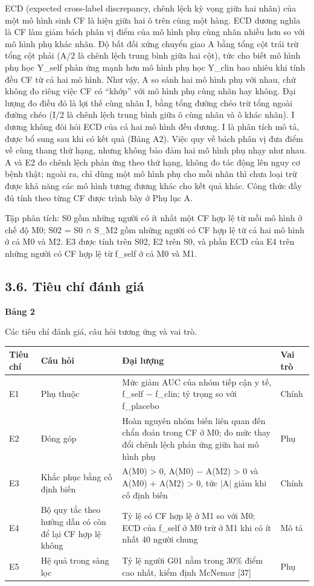 \documentclass[9pt,a4paper]{extarticle}
\newcommand{\tabcap}[2]{{\footnotesize\textbf{Bảng #1}\par\vspace{1pt}#2\par}\vspace{3pt}\scriptsize}
\begin{document}
ECD (expected cross-label discrepancy, chênh lệch kỳ vọng giữa hai nhãn)
của một mô hình sinh CF là hiệu giữa hai ô trên cùng một hàng. ECD dương
nghĩa là CF làm giảm bách phân vị điểm của mô hình phụ cùng nhãn nhiều
hơn so với mô hình phụ khác nhãn. Độ bất đối xứng chuyển giao A bằng
tổng cột trái trừ tổng cột phải (A/2 là chênh lệch trung bình giữa hai
cột), tức cho biết mô hình phụ học Y\_self phản ứng mạnh hơn mô hình phụ
học Y\_clin bao nhiêu khi tính đều CF từ cả hai mô hình. Như vậy, A so
sánh hai mô hình phụ với nhau, chứ không đo riêng việc CF có ``khớp''
với mô hình phụ cùng nhãn hay không. Đại lượng đo điều đó là lợi thế
cùng nhãn I, bằng tổng đường chéo trừ tổng ngoài đường chéo (I/2 là
chênh lệch trung bình giữa ô cùng nhãn và ô khác nhãn). I dương không
đòi hỏi ECD của cả hai mô hình đều dương. I là phân tích mô tả, được bổ
sung sau khi có kết quả (Bảng A2). Việc quy về bách phân vị đưa điểm về
cùng thang thứ hạng, nhưng không bảo đảm hai mô hình phụ nhạy như nhau.
A và E2 đo chênh lệch phản ứng theo thứ hạng, không đo tác động lên nguy
cơ bệnh thật; ngoài ra, chỉ dùng một mô hình phụ cho mỗi nhãn thì chưa
loại trừ được khả năng các mô hình tương đương khác cho kết quả khác.
Công thức đầy đủ tính theo từng CF được trình bày ở Phụ lục A.

Tập phân tích: S0 gồm những người có ít nhất một CF hợp lệ từ mỗi mô
hình ở chế độ M0; S02 = S0 ∩ S\_M2 gồm những người có CF hợp lệ từ cả
hai mô hình ở cả M0 và M2. E3 được tính trên S02, E2 trên S0, và phần
ECD của E4 trên những người có CF hợp lệ từ f\_self ở cả M0 và M1.

\subsection{3.6. Tiêu chí đánh giá}

\begin{table}[!t]
\tabcap{2}{Các tiêu chí đánh giá, câu hỏi tương ứng và vai trò.}
\begin{tabularx}{\textwidth}{>{\raggedright\arraybackslash}X>{\raggedright\arraybackslash}X>{\raggedright\arraybackslash}X>{\raggedright\arraybackslash}X}
\toprule
\textbf{Tiêu chí} & \textbf{Câu hỏi} & \textbf{Đại lượng} & \textbf{Vai trò} \\ \midrule
E1 & Phụ thuộc & Mức giảm AUC của nhóm tiếp cận y tế, f\_self − f\_clin; tỷ trọng so với f\_placebo & Chính \\
E2 & Đóng góp & Hoàn nguyên nhóm biến liên quan đến chẩn đoán trong CF ở M0; đo mức thay đổi chênh lệch phản ứng giữa hai mô hình phụ & Phụ \\
E3 & Khắc phục bằng cố định biến & A(M0) > 0, A(M0) − A(M2) > 0 và A(M0) + A(M2) > 0, tức |A| giảm khi cố định biến & Chính \\
E4 & Bộ quy tắc theo hướng dẫn có còn để lại CF hợp lệ không & Tỷ lệ có CF hợp lệ ở M1 so với M0; ECD của f\_self ở M0 trừ ở M1 khi có ít nhất 40 người chung & Mô tả \\
E5 & Hệ quả trong sàng lọc & Tỷ lệ người G01 nằm trong 30\% điểm cao nhất, kiểm định McNemar [37] & Phụ \\
\bottomrule
\end{tabularx}
\end{table}
\end{document}
